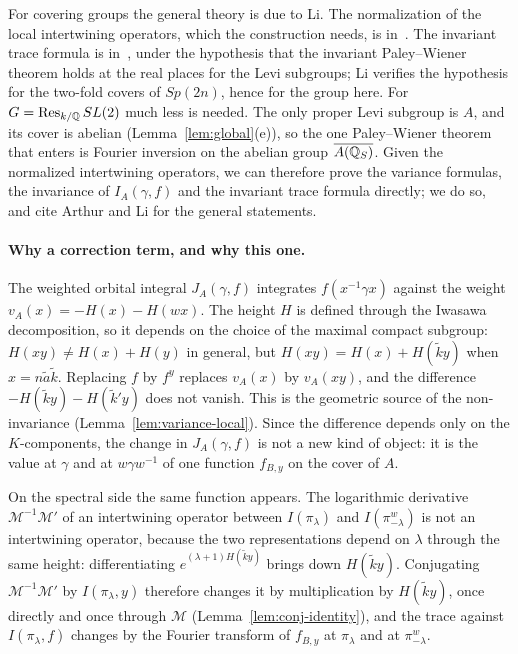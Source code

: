 For covering groups the general theory is due to Li. The normalization
of the local intertwining operators, which the construction needs, is
in~\cite{Li12a}. The invariant trace formula is in~\cite{Li14b}, under the
hypothesis that the invariant Paley--Wiener theorem holds at the real
places for the Levi subgroups; Li verifies the hypothesis for the
two-fold covers of $Sp(2n)$, hence for the group here. For
$G=\operatorname{Res}_{k/\mathbb{Q}}SL(2)$ much less is needed. The only proper Levi subgroup is
$A$, and its cover is abelian (Lemma~\ref{lem:global}(e)), so the one
Paley--Wiener theorem that enters is Fourier inversion on the abelian
group $\overline{A(\mathbb{Q}_S)}$. Given the normalized intertwining operators, we can
therefore prove the variance formulas, the invariance of $I_A(\gamma,f)$
and the invariant trace formula directly; we do so, and cite
Arthur and Li for the general statements.

\paragraph{Why a correction term, and why this one.} The weighted
orbital integral $J_A(\gamma,f)$ integrates $f(x^{-1}\gamma x)$ against the
weight $v_A(x)=-H(x)-H(wx)$. The height $H$ is defined through the
Iwasawa decomposition, so it depends on the choice of the maximal compact
subgroup: $H(xy)\ne H(x)+H(y)$ in general, but $H(xy)=H(x)+H(\tilde ky)$
when $x=n\tilde a\tilde k$. Replacing $f$ by $f^y$ replaces $v_A(x)$ by
$v_A(xy)$, and the difference $-H(\tilde ky)-H(\tilde k'y)$ does not
vanish. This is the geometric source of the non-invariance
(Lemma~\ref{lem:variance-local}). Since the difference depends only on the
$K$-components, the change in $J_A(\gamma,f)$ is not a new kind of
object: it is the value at $\gamma$ and at $w\gamma w^{-1}$ of one function
$f_{B,y}$ on the cover of $A$.

On the spectral side the same function appears. The logarithmic
derivative $\mathcal M^{-1}\mathcal M'$ of an intertwining operator
between $I(\pi_\lambda)$ and $I(\pi^w_{-\lambda})$ is not an intertwining
operator, because the two representations depend on $\lambda$ through
the same height: differentiating $e^{(\lambda+1)H(\tilde ky)}$ brings down
$H(\tilde ky)$. Conjugating $\mathcal M^{-1}\mathcal M'$ by $I(\pi_\lambda,
y)$ therefore changes it by multiplication by $H(\tilde ky)$, once
directly and once through $\mathcal M$ (Lemma~\ref{lem:conj-identity}),
and the trace against $I(\pi_\lambda,f)$ changes by the Fourier transform
of $f_{B,y}$ at $\pi_\lambda$ and at $\pi^w_{-\lambda}$.

